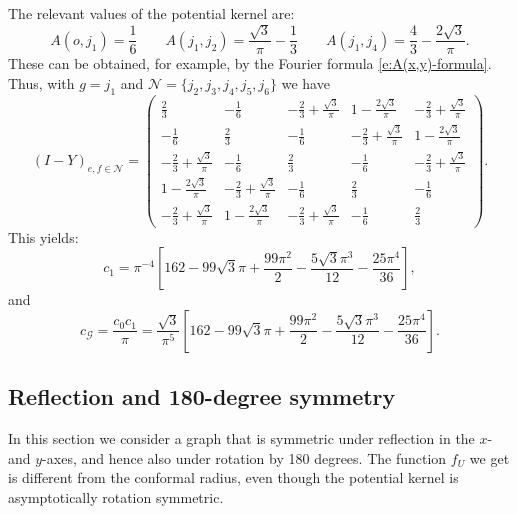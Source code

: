 \documentclass[11pt]{article}
\theoremstyle{remark}
\def\cG{\mathcal{G}}
\begin{document}
The relevant values of the potential kernel are:
\[ A(o,j_1) = \frac{1}{6} \qquad 
   A(j_1,j_2) = \frac{\sqrt{3}}{\pi} - \frac{1}{3} \qquad
   A(j_1,j_4) = \frac{4}{3} - \frac{2 \sqrt{3}}{\pi}. \]
These can be obtained, for example, by the Fourier formula \eqref{e:A(x,y)-formula}.
Thus, with $g = j_1$ and $\mathcal{N} = \{ j_2, j_3, j_4, j_5, j_6 \}$ we have
\[ (I - Y)_{e,f \in \mathcal{N}}
   = \begin{pmatrix}
   \frac{2}{3} & - \frac{1}{6} & -\frac{2}{3} + \frac{\sqrt{3}}{\pi} 
      & 1 - \frac{2\sqrt{3}}{\pi} & -\frac{2}{3} + \frac{\sqrt{3}}{\pi} \\[0.2cm]
   -\frac{1}{6} & \frac{2}{3} & -\frac{1}{6} & -\frac{2}{3} + \frac{\sqrt{3}}{\pi}
      & 1 - \frac{2\sqrt{3}}{\pi} \\[0.2cm]
   -\frac{2}{3} + \frac{\sqrt{3}}{\pi} & -\frac{1}{6} & \frac{2}{3} 
      & -\frac{1}{6} & -\frac{2}{3} + \frac{\sqrt{3}}{\pi} \\[0.2cm]
   1 - \frac{2\sqrt{3}}{\pi} & -\frac{2}{3} + \frac{\sqrt{3}}{\pi} & -\frac{1}{6} 
      & \frac{2}{3} & -\frac{1}{6} \\[0.2cm]
   -\frac{2}{3} + \frac{\sqrt{3}}{\pi} & 1 - \frac{2\sqrt{3}}{\pi}
      & -\frac{2}{3} + \frac{\sqrt{3}}{\pi} & -\frac{1}{6} & \frac{2}{3}
   \end{pmatrix}. \]
This yields:
\[ c_1
   = \pi^{-4} \left[ 162 - 99 \sqrt{3} \pi + \frac{99 \pi^{2}}{2}
     - \frac{5 \sqrt{3} \pi^3}{12} - \frac{25 \pi^{4}}{36} \right], \]
and
\[ c_\cG 
   = \frac{c_0 c_1}{\pi} 
   = \frac{\sqrt{3}}{\pi^5} \left[ 162 - 99 \sqrt{3} \pi + \frac{99 \pi^{2}}{2}
     - \frac{5 \sqrt{3} \pi^3}{12} - \frac{25 \pi^{4}}{36} \right]. \]


\subsection{Reflection and 180-degree symmetry}
\label{ssec:180}

In this section we consider a graph that is symmetric under reflection in the $x$- and $y$-axes,
and hence also under rotation by 180 degrees. The function $f_U$ we get is different from the
conformal radius, even though the potential kernel is asymptotically rotation symmetric.
\end{document}
